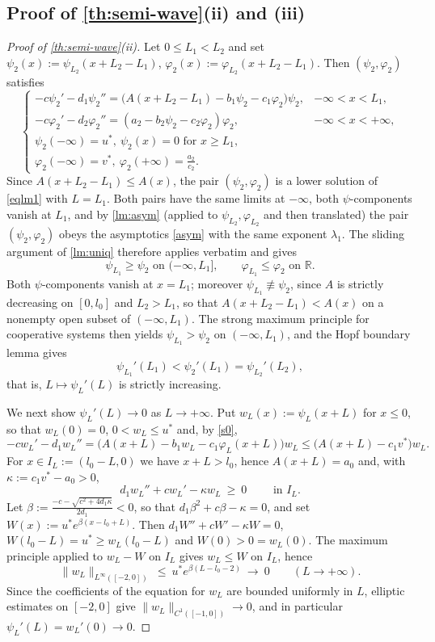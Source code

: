 \documentclass[reqno]{amsart}
\theoremstyle{plain}
\theoremstyle{definition}
\theoremstyle{remark}
\begin{document}
\subsection{Proof of \texorpdfstring{\cref{th:semi-wave}}{the semi-wave theorem}(ii) and (iii)}

\begin{proof}[Proof of \cref{th:semi-wave}(ii)]
	Let $0\le L_1<L_2$ and set $\psi_2(x):=\psi_{L_2}(x+L_2-L_1)$,
	$\varphi_2(x):=\varphi_{L_2}(x+L_2-L_1)$. Then $(\psi_2,\varphi_2)$ satisfies
	\[
	\begin{cases}
		-c \psi_2' - d_1 \psi_2'' = \big(A(x + L_2 - L_1) - b_1\psi_2 - c_1\varphi_2\big)\psi_2, & -\infty < x < L_1,\\
		-c \varphi_2' - d_2 \varphi_2'' = (a_2 - b_2\psi_2 - c_2\varphi_2)\varphi_2, & -\infty < x < +\infty,\\
		\psi_2(-\infty) = u^*, ~ \psi_2(x)=0 \text{ for } x\ge L_1,\\
		\varphi_2(-\infty) = v^*, ~ \varphi_2(+\infty)=\frac{a_2}{c_2} .
	\end{cases}
	\]
	Since $A(x+L_2-L_1)\le A(x)$, the pair $(\psi_2,\varphi_2)$ is a lower
	solution of \eqref{eqlm1} with $L=L_1$. Both pairs have the same limits at
	$-\infty$, both $\psi$-components vanish at $L_1$, and by \cref{lm:asym}
	(applied to $\psi_{L_2},\varphi_{L_2}$ and then translated) the pair
	$(\psi_2,\varphi_2)$ obeys the asymptotics \eqref{asym} with the same exponent
	$\lambda_1$. The sliding argument of \cref{lm:uniq} therefore applies verbatim
	and gives
	\[
	\psi_{L_1}\ge\psi_2 \text{ on }(-\infty,L_1],
	\qquad \varphi_{L_1}\le\varphi_2 \text{ on }\mathbb{R} .
	\]
	Both $\psi$-components vanish at $x=L_1$; moreover
	$\psi_{L_1}\not\equiv\psi_2$, since $A$ is strictly decreasing on $[0,l_0]$
	and $L_2>L_1$, so that $A(x+L_2-L_1)<A(x)$ on a nonempty open subset of
	$(-\infty,L_1)$. The strong maximum principle for cooperative systems then
	yields $\psi_{L_1}>\psi_2$ on $(-\infty,L_1)$, and the Hopf boundary lemma
	gives
	\[
	\psi_{L_1}'(L_1) < \psi_2'(L_1) = \psi_{L_2}'(L_2),
	\]
	that is, $L\mapsto\psi_L'(L)$ is strictly increasing.

	We next show $\psi_L'(L)\to0$ as $L\to+\infty$. Put $w_L(x):=\psi_L(x+L)$ for
	$x\le0$, so that $w_L(0)=0$, $0<w_L\le u^*$ and, by \eqref{s0},
	\[
	-cw_L'-d_1w_L''=\big(A(x+L)-b_1w_L-c_1\varphi_L(x+L)\big)w_L
	\le\big(A(x+L)-c_1v^*\big)w_L .
	\]
	For $x\in I_L:=(l_0-L,0)$ we have $x+L>l_0$, hence $A(x+L)=a_0$ and,
	with $\kappa:=c_1v^*-a_0>0$,
	\[
	d_1w_L''+cw_L'-\kappa w_L\ \ge\ 0 \qquad\text{ in } I_L .
	\]
	Let $\beta:=\frac{-c-\sqrt{c^2+4d_1\kappa}}{2d_1}<0$, so that
	$d_1\beta^2+c\beta-\kappa=0$, and set
	$W(x):=u^* e^{\beta(x-l_0+L)}$. Then $d_1W''+cW'-\kappa W=0$,
	$W(l_0-L)=u^*\ge w_L(l_0-L)$ and $W(0)>0=w_L(0)$. The maximum principle
	applied to $w_L-W$ on $I_L$ gives $w_L\le W$ on $I_L$, hence
	\[
	\|w_L\|_{L^\infty([-2,0])}\ \le\ u^* e^{\beta(L-l_0-2)}\ \longrightarrow\ 0
	\qquad (L\to+\infty).
	\]
	Since the coefficients of the equation for $w_L$ are bounded uniformly in
	$L$, elliptic estimates on $[-2,0]$ give
	$\|w_L\|_{C^1([-1,0])}\to0$, and in particular
	$\psi_L'(L)=w_L'(0)\to0$.
\end{proof}
\end{document}

